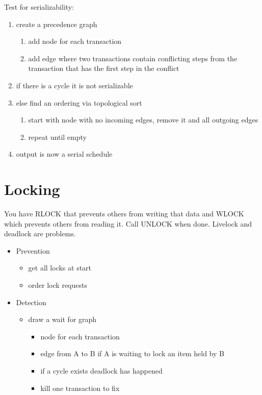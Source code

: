 \documentclass{article}
\begin{document}
Test for serializability:
\begin{enumerate}
    \item create a precedence graph
    \begin{enumerate}
        \item add node for each transaction
        \item add edge where two transactions contain conflicting steps from the transaction that has the first step in the conflict
    \end{enumerate}
    \item if there is a cycle it is not serializable
    \item else find an ordering via topological sort
    \begin{enumerate}
        \item start with node with no incoming edges, remove it and all outgoing edges
        \item repeat until empty
    \end{enumerate}
    \item output is now a serial schedule
\end{enumerate}


\section*{Locking} %
\label{sec:locking}
You have RLOCK that prevents others from writing that data and WLOCK which prevents others from reading it. Call UNLOCK when done. Livelock and deadlock are problems.
\begin{itemize}
    \item Prevention
    \begin{itemize}
        \item get all locks at start
        \item order lock requests
    \end{itemize}
    \item Detection
    \begin{itemize}
        \item draw a wait for graph
        \begin{itemize}
            \item node for each transaction
            \item edge from A to B if A is waiting to lock an item held by B
            \item if a cycle exists deadlock has happened
            \item kill one transaction to fix
        \end{itemize}
    \end{itemize}
\end{itemize}
\end{document}
